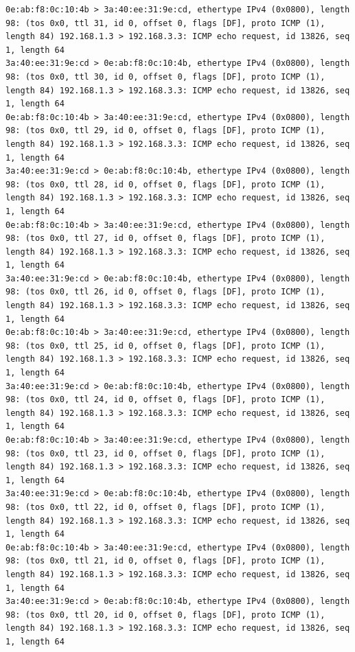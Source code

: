 \documentclass[a4paper,12pt]{article}
\begin{document}
\begin{Verbatim}
0e:ab:f8:0c:10:4b > 3a:40:ee:31:9e:cd, ethertype IPv4 (0x0800), length 98: (tos 0x0, ttl 31, id 0, offset 0, flags [DF], proto ICMP (1), length 84) 192.168.1.3 > 192.168.3.3: ICMP echo request, id 13826, seq 1, length 64
3a:40:ee:31:9e:cd > 0e:ab:f8:0c:10:4b, ethertype IPv4 (0x0800), length 98: (tos 0x0, ttl 30, id 0, offset 0, flags [DF], proto ICMP (1), length 84) 192.168.1.3 > 192.168.3.3: ICMP echo request, id 13826, seq 1, length 64
0e:ab:f8:0c:10:4b > 3a:40:ee:31:9e:cd, ethertype IPv4 (0x0800), length 98: (tos 0x0, ttl 29, id 0, offset 0, flags [DF], proto ICMP (1), length 84) 192.168.1.3 > 192.168.3.3: ICMP echo request, id 13826, seq 1, length 64
3a:40:ee:31:9e:cd > 0e:ab:f8:0c:10:4b, ethertype IPv4 (0x0800), length 98: (tos 0x0, ttl 28, id 0, offset 0, flags [DF], proto ICMP (1), length 84) 192.168.1.3 > 192.168.3.3: ICMP echo request, id 13826, seq 1, length 64
0e:ab:f8:0c:10:4b > 3a:40:ee:31:9e:cd, ethertype IPv4 (0x0800), length 98: (tos 0x0, ttl 27, id 0, offset 0, flags [DF], proto ICMP (1), length 84) 192.168.1.3 > 192.168.3.3: ICMP echo request, id 13826, seq 1, length 64
3a:40:ee:31:9e:cd > 0e:ab:f8:0c:10:4b, ethertype IPv4 (0x0800), length 98: (tos 0x0, ttl 26, id 0, offset 0, flags [DF], proto ICMP (1), length 84) 192.168.1.3 > 192.168.3.3: ICMP echo request, id 13826, seq 1, length 64
0e:ab:f8:0c:10:4b > 3a:40:ee:31:9e:cd, ethertype IPv4 (0x0800), length 98: (tos 0x0, ttl 25, id 0, offset 0, flags [DF], proto ICMP (1), length 84) 192.168.1.3 > 192.168.3.3: ICMP echo request, id 13826, seq 1, length 64
3a:40:ee:31:9e:cd > 0e:ab:f8:0c:10:4b, ethertype IPv4 (0x0800), length 98: (tos 0x0, ttl 24, id 0, offset 0, flags [DF], proto ICMP (1), length 84) 192.168.1.3 > 192.168.3.3: ICMP echo request, id 13826, seq 1, length 64
0e:ab:f8:0c:10:4b > 3a:40:ee:31:9e:cd, ethertype IPv4 (0x0800), length 98: (tos 0x0, ttl 23, id 0, offset 0, flags [DF], proto ICMP (1), length 84) 192.168.1.3 > 192.168.3.3: ICMP echo request, id 13826, seq 1, length 64
3a:40:ee:31:9e:cd > 0e:ab:f8:0c:10:4b, ethertype IPv4 (0x0800), length 98: (tos 0x0, ttl 22, id 0, offset 0, flags [DF], proto ICMP (1), length 84) 192.168.1.3 > 192.168.3.3: ICMP echo request, id 13826, seq 1, length 64
0e:ab:f8:0c:10:4b > 3a:40:ee:31:9e:cd, ethertype IPv4 (0x0800), length 98: (tos 0x0, ttl 21, id 0, offset 0, flags [DF], proto ICMP (1), length 84) 192.168.1.3 > 192.168.3.3: ICMP echo request, id 13826, seq 1, length 64
3a:40:ee:31:9e:cd > 0e:ab:f8:0c:10:4b, ethertype IPv4 (0x0800), length 98: (tos 0x0, ttl 20, id 0, offset 0, flags [DF], proto ICMP (1), length 84) 192.168.1.3 > 192.168.3.3: ICMP echo request, id 13826, seq 1, length 64

\end{Verbatim}
\end{document}
